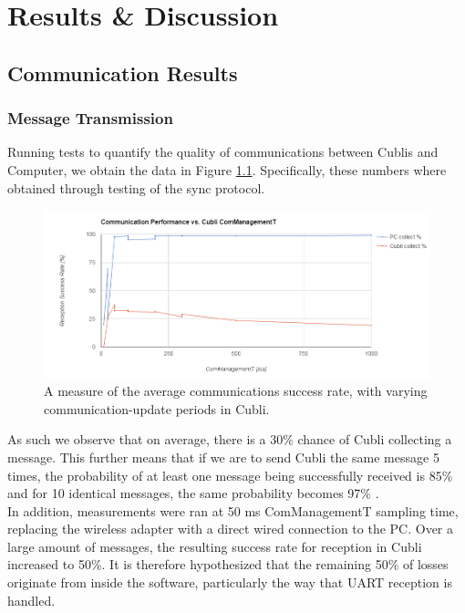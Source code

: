 \chapter{Results \& Discussion}\label{sec:results}

\section{Communication Results}

\subsection{Message Transmission}

Running tests to quantify the quality of communications between Cublis and Computer, we obtain the data in Figure \ref{img:comStats}. Specifically, these numbers where obtained through testing of the sync protocol.

\begin{figure}[H]
   \centering
   \includegraphics[width=1\textwidth]{img/comStats.png}
   \caption{A measure of the average communications success rate, with varying communication-update periods in Cubli.}
   \label{img:comStats}
\end{figure}

As such we observe that on average, there is a 30\% chance of Cubli collecting a message. This further means that if we are to send Cubli the same message 5 times, the probability of at least one message being successfully received is 85\% and for 10 identical messages, the same probability becomes 97\% .\\

In addition, measurements were ran at 50 ms ComManagementT sampling time, replacing the wireless adapter with a direct wired connection to the PC. Over a large amount of messages, the resulting success rate for reception in Cubli increased to 50\%. It is therefore hypothesized that the remaining 50\% of losses originate from inside the software, particularly the way that UART reception is handled.\\

